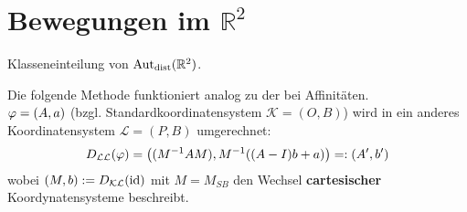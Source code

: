 \documentclass[parskip,a4paper,twoside,DIV15,BCOR12mm]{scrbook}
\begin{document}
\section{Bewegungen im $\mathbb{R}^2$}
\begin{task}
Klasseneinteilung von $\operatorname{Aut_{dist}}(\mathbb{R}^2)$.
\end{task}

\begin{method}
Die folgende Methode funktioniert analog zu der bei Affinitäten.\\ 
$\varphi=(A,a)$ (bzgl. Standardkoordinatensystem $\mathcal{K}=(O,B)$) wird in ein 
anderes Koordinatensystem $\mathcal{L}=(P,B)$ umgerechnet:
\[D_{\mathcal{L}\mathcal{L}}(\varphi)=\left((M^{-1}AM),M^{-1}((A-I)b+a)\right)=:(A',b')\]
wobei $(M,b):=D_{\mathcal{K}\mathcal{L}}(\operatorname{id})$ mit $M=M_{SB}$ den Wechsel \textbf{cartesischer}
Koordynatensysteme beschreibt.
\end{method}

\renewcommand{\indexname}{Stichwortverzeichnis}
\printindex
\end{document}
